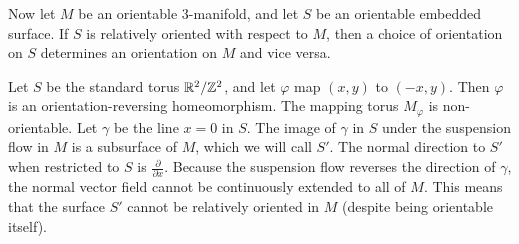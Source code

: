 Now let $M$ be an orientable 3-manifold, and let $S$ be an orientable embedded surface.  If $S$ is relatively oriented with respect to $M$, then a choice of orientation on $S$ determines an orientation on $M$ and vice versa.

  Let $S$ be the standard torus $\mathbb{R}^2/\mathbb{Z}^2$, and let $\varphi$ map $(x,y)$ to $(-x, y)$.
  Then $\varphi$ is an orientation-reversing homeomorphism.
  The mapping torus $M_\varphi$ is non-orientable.
  Let $\gamma$ be the line $x=0$ in $S$. %
  The image of $\gamma$ in $S$ under the suspension flow in $M$ is a subsurface of $M$, which we will call $S'$.
  The normal direction to $S'$ when restricted to $S$ is $\frac{\partial}{\partial x}$.
  Because the suspension flow reverses the direction of $\gamma$, the normal vector field cannot be continuously extended to all of $M$.
  This means that the surface $S'$ cannot be relatively oriented in $M$ (despite being orientable itself).

\medskip



